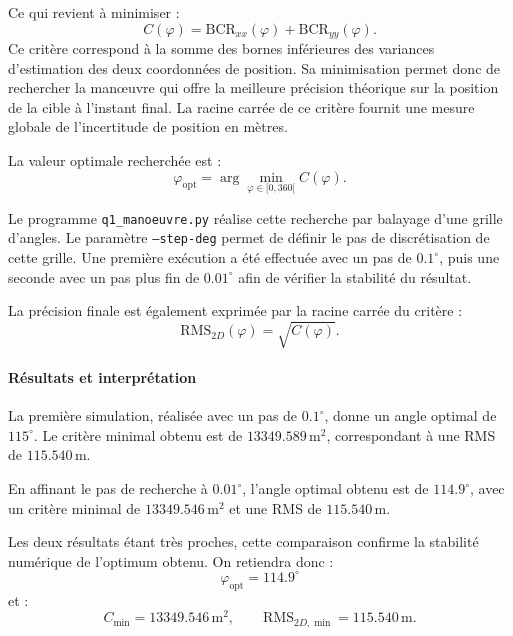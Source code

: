 \documentclass[12pt,a4paper]{article}
\begin{document}
Ce qui revient à minimiser :
\begin{equation}
C(\varphi)=
\mathrm{BCR}_{xx}(\varphi)
+
\mathrm{BCR}_{yy}(\varphi).
\end{equation}
Ce critère correspond à la somme des bornes inférieures des variances d'estimation des deux coordonnées de position. Sa minimisation permet donc de rechercher la manœuvre qui offre la meilleure précision théorique sur la position de la cible à l'instant final. La racine carrée de ce critère fournit une mesure globale de l'incertitude de position en mètres.

La valeur optimale recherchée est :
\begin{equation}
\boxed{
\varphi_{\mathrm{opt}}
=
\arg\min_{\varphi\in[0,360[} C(\varphi).
}
\end{equation}

Le programme \texttt{q1\_manoeuvre.py} réalise cette recherche par balayage d'une grille d'angles. Le paramètre \texttt{--step-deg} permet de définir le pas de discrétisation de cette grille. Une première exécution a été effectuée avec un pas de $0.1^\circ$, puis une seconde avec un pas plus fin de $0.01^\circ$ afin de vérifier la stabilité du résultat.

La précision finale est également exprimée par la racine carrée du critère :
\begin{equation}
\mathrm{RMS}_{2D}(\varphi)=\sqrt{C(\varphi)}.
\end{equation}

\paragraph{Résultats et interprétation}

La première simulation, réalisée avec un pas de $0.1^\circ$, donne un angle optimal de $115^\circ$. Le critère minimal obtenu est de $13349.589\,\mathrm{m}^2$, correspondant à une RMS de $115.540\,\mathrm{m}$.

En affinant le pas de recherche à $0.01^\circ$, l'angle optimal obtenu est de $114.9^\circ$, avec un critère minimal de $13349.546\,\mathrm{m}^2$ et une RMS de $115.540\,\mathrm{m}$.

Les deux résultats étant très proches, cette comparaison confirme la stabilité numérique de l'optimum obtenu. On retiendra donc :
\begin{equation}
\boxed{
\varphi_{\mathrm{opt}}=114.9^\circ
}
\end{equation}
et :
\begin{equation}
\boxed{
C_{\min}=13349.546\,\mathrm{m}^2,
\qquad
\mathrm{RMS}_{2D,\min}=115.540\,\mathrm{m}.
}
\end{equation}
\end{document}
